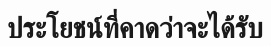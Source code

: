 \section{ประโยชน์ที่คาดว่าจะได้รับ}


\begin{subitems}
    \item \dotfill
    \item \dotfill
\end{subitems}
